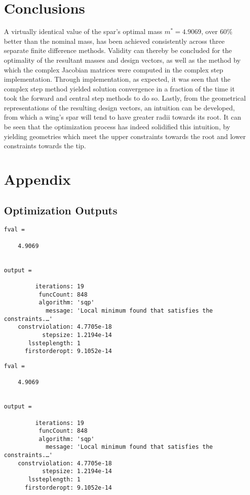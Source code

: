 \documentclass{article}
\begin{document}
\section{Conclusions}
A virtually identical value of the spar's optimal mass $m^* = 4.9069$, over $60\%$ better than the nominal mass, has been achieved consistently across three separate finite difference methods. Validity can thereby be concluded for the optimality of the resultant masses and design vectors, as well as the method by which the complex Jacobian matrices were computed in the complex step implementation. Through implementation, as expected, it was seen that the complex step method yielded solution convergence in a fraction of the time it took the forward and central step methods to do so. Lastly, from the geometrical representations of the resulting design vectors, an intuition can be developed, from which a wing's spar will tend to have greater radii towards its root. It can be seen that the optimization process has indeed solidified this intuition, by yielding geometries which meet the upper constraints towards the root and lower constraints towards the tip.

 


\section{Appendix}
\subsection{Optimization Outputs}
\begin{lstlisting}[caption=Forward Step Output, label=forward40, float]
fval =

    4.9069


output = 

         iterations: 19
          funcCount: 848
          algorithm: 'sqp'
            message: 'Local minimum found that satisfies the constraints.…'
    constrviolation: 4.7705e-18
           stepsize: 1.2194e-14
       lssteplength: 1
      firstorderopt: 9.1052e-14
\end{lstlisting}

\begin{lstlisting}[caption=Central Step Output, label=central40, float]
fval =

    4.9069


output = 

         iterations: 19
          funcCount: 848
          algorithm: 'sqp'
            message: 'Local minimum found that satisfies the constraints.…'
    constrviolation: 4.7705e-18
           stepsize: 1.2194e-14
       lssteplength: 1
      firstorderopt: 9.1052e-14
\end{lstlisting}
\end{document}
